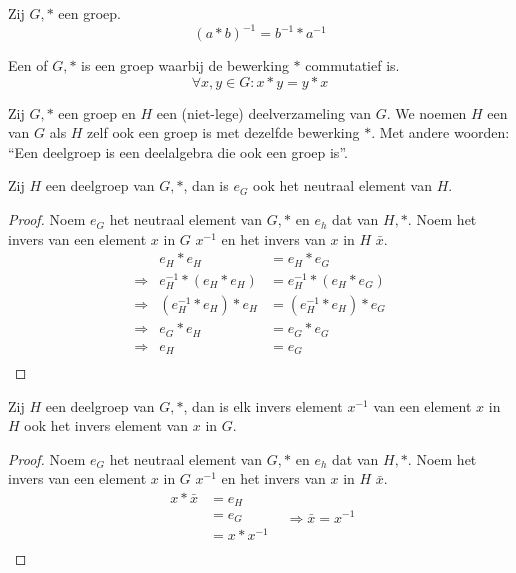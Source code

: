 \documentclass[main.tex]{subfiles}
\begin{document}
\begin{st}
  Zij $G,*$ een groep.
  \[ (a*b)^{-1} = b^{-1} * a^{-1} \]
\end{st}

\begin{de}
  Een  of  $G,*$ is een groep waarbij de bewerking $*$ commutatief is.
  \[ \forall x,y \in G: x * y = y * x\]
\end{de}

\begin{de}
  Zij $G,*$ een groep en $H$ een (niet-lege) deelverzameling van $G$. We noemen $H$ een  van $G$ als $H$ zelf ook een groep is met dezelfde bewerking $*$.
  Met andere woorden: ``Een deelgroep is een deelalgebra die ook een groep is''.
\end{de}

\begin{st}
  \label{st:deelgroep-zelfde-neutraal-element}
  Zij $H$ een deelgroep van $G,*$, dan is $e_{G}$ ook het neutraal element van $H$.

  \begin{proof}
    Noem $e_{G}$ het neutraal element van $G,*$ en $e_{h}$ dat van $H,*$. Noem het invers van een element $x$ in $G$ $x^{-1}$ en het invers van $x$ in $H$ $\bar{x}$.
    \[
    \begin{array}{rrl}
                  & e_{H} * e_{H} &= e_{H} * e_{G}\\
      \Rightarrow & e^{-1}_{H} * (e_{H} * e_{H}) &= e^{-1}_{H} * (e_{H} * e_{G})\\
      \Rightarrow & (e^{-1}_{H} * e_{H}) * e_{H} &= (e^{-1}_{H} * e_{H}) * e_{G}\\
      \Rightarrow & e_{G} * e_{H} &= e_{G} * e_{G}\\
      \Rightarrow & e_{H} &= e_{G}\\
    \end{array}
    \]
  \end{proof}
\end{st}

\begin{st}
  \label{st:deelgroep-houdt-invers-ook-in}
  Zij $H$ een deelgroep van $G,*$, dan is elk invers element $x^{-1}$ van een element $x$ in $H$ ook het invers element van $x$ in $G$.

  \begin{proof}
    Noem $e_{G}$ het neutraal element van $G,*$ en $e_{h}$ dat van $H,*$.
    Noem het invers van een element $x$ in $G$ $x^{-1}$ en het invers van $x$ in $H$ $\bar{x}$.
    \[
    \begin{array}{rll}
      x * \bar x &= e_{H} &\\
                 &= e_{G} &\\
                 &= x * x^{-1} &\\
    \end{array}
    \Rightarrow \bar x = x^{-1}
    \]
  \end{proof}
\end{st}
\end{document}
